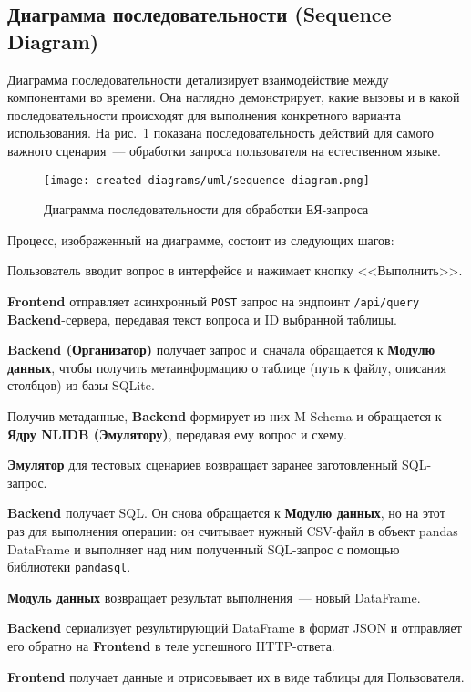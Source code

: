 \subsection{Диаграмма последовательности (Sequence Diagram)}

Диаграмма последовательности детализирует взаимодействие между компонентами во времени.
Она наглядно демонстрирует, какие вызовы и в какой последовательности происходят для
выполнения конкретного варианта использования. На рис.~\ref{fig:sequence-diagram} показана
последовательность действий для самого важного сценария~--- обработки запроса пользователя на
естественном языке.

\begin{figure}[ht]
      \centering
      \texttt{[image: created-diagrams/uml/sequence-diagram.png]}
      \caption{Диаграмма последовательности для обработки ЕЯ-запроса}
      \label{fig:sequence-diagram}
\end{figure}

Процесс, изображенный на диаграмме, состоит из следующих шагов:
\begin{compactenum}
      \item Пользователь вводит вопрос в интерфейсе и нажимает кнопку <<Выполнить>>.
      \item \textbf{Frontend} отправляет асинхронный \verb|POST| запрос на эндпоинт
      \verb|/api/query| \textbf{Backend}-сервера, передавая текст вопроса и ID выбранной таблицы.
      \item \textbf{Backend (Организатор)} получает запрос и\
      сначала обращается к \textbf{Модулю данных}, чтобы получить метаинформацию о таблице
      (путь к файлу, описания столбцов) из базы SQLite.
      \item Получив метаданные, \textbf{Backend} формирует из них M-Schema и
      обращается к \textbf{Ядру NLIDB (Эмулятору)}, передавая ему вопрос и схему.
      \item \textbf{Эмулятор} для тестовых сценариев возвращает заранее заготовленный SQL-запрос.
      \item \textbf{Backend} получает SQL. Он снова обращается к \textbf{Модулю данных},
      но на этот раз для выполнения операции: он считывает нужный CSV-файл в объект pandas
      DataFrame и выполняет над ним полученный SQL-запрос с помощью библиотеки \texttt{pandasql}.
      \item \textbf{Модуль данных} возвращает результат выполнения~--- новый DataFrame.
      \item \textbf{Backend} сериализует результирующий DataFrame в формат JSON и
      отправляет его обратно на \textbf{Frontend} в теле успешного HTTP-ответа.
      \item \textbf{Frontend} получает данные и отрисовывает их в виде таблицы для
      Пользователя.
\end{compactenum}

